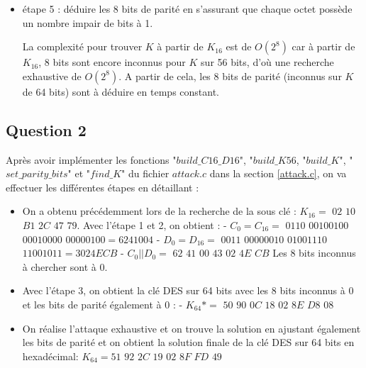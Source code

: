 \documentclass[11pt]{article}
\begin{document}
\begin{itemize}
	\item étape 5 : déduire les 8 bits de parité en s'assurant que chaque octet possède un nombre impair de bits à 1. \newline
	
	La complexité pour trouver $K$ à partir de $K_{16}$ est de $O(2^8)$ car à partir de $K_{16}$, 8 bits sont encore inconnus pour $K$ sur 56 bits, d'où une recherche exhaustive de $O(2^8)$. A partir de cela, les 8 bits de parité (inconnus sur $K$ de 64 bits) sont à déduire en temps constant. 
	
	
\end{itemize}

\subsection{Question 2}

Après avoir implémenter les fonctions "$build\_C16\_D16$", "$build\_K56$, "$build\_K$", "$set\_parity\_bits$" et "$find\_K$" du fichier $attack.c$ dans la section \ref{attack.c}, on va effectuer les différentes étapes en détaillant : 

\begin{itemize}

\item On a obtenu précédemment lors de la recherche de la sous clé : $K_{16}= $ $02$ $10$ $B1$ $2C$ $47$ $79$. \newline \newline
Avec l'étape 1 et 2, on obtient : \newline 
- $C_{0}=C_{16}=$ $0110$ $00100100$ $00010000$ $00000100= 6241004$ \newline 
- $D_{0}=D_{16}=$ $0011$ $00000010$ $01001110$ $11001011= 3024ECB$ \newline
- $C_{0}||D_{0}=$ $62$ $41$ $00$ $43$ $02$ $4E$ $CB$ \newline
Les 8 bits inconnus à chercher sont à $0$. \newline

\item Avec l'étape 3, on obtient la clé DES sur 64 bits avec les 8 bits inconnus à 0 et les bits de parité également à 0 : \newline
- $K_{64}*=$ $50$ $90$ $0C$ $18$ $02$ $8E$ $D8$ $08$ \newline

\item On réalise l'attaque exhaustive et on trouve la solution en ajustant également les bits de parité et on obtient la solution finale de la clé DES sur 64 bits en hexadécimal: \newline 
\color{red}
$K_{64}=51$ $92$ $2C$ $19$ $02$ $8F$ $FD$ $49$
\color{black}

\end{itemize}
\end{document}
